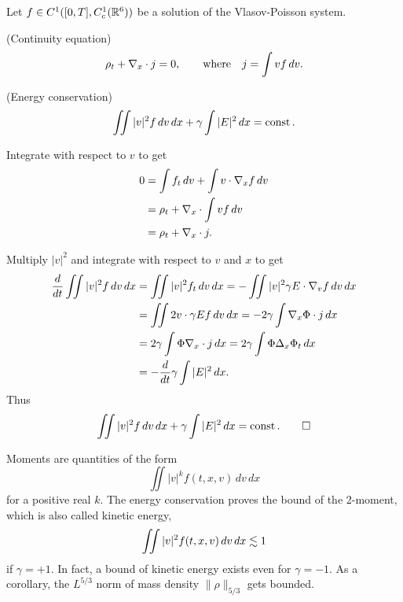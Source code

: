 \documentclass[11pt]{amsart}
\begin{document}
\begin{lem}
Let $f\in C^1([0,T],C_c^1(\mathbb{R}^6))$ be a solution of the Vlasov-Poisson system.
\begin{cond}
\item(Continuity equation)
\[\rho_t+\nabla_x\cdot j=0,\qquad\text{where}\quad j=\int vf\,dv.\]
\item(Energy conservation)
\[\iint|v|^2f\,dv\,dx+\gamma\int|E|^2\,dx=\operatorname{const}.\]
\end{cond}
\end{lem}
\begin{pfs}
\item
Integrate with respect to $v$ to get
\begin{align*}
0&=\int f_t\,dv+\int v\cdot\nabla_xf\,dv\\
&=\rho_t+\nabla_x\cdot\int vf\,dv\\
&=\rho_t+\nabla_x\cdot j.
\end{align*}
\item
Multiply $|v|^2$ and integrate with respect to $v$ and $x$ to get
\begin{align*}
\dd{t}\iint|v|^2f\,dv\,dx
&=\iint|v|^2f_t\,dv\,dx=-\iint|v|^2\gamma E\cdot\del_vf\,dv\,dx\\
&=\iint2v\cdot\gamma Ef\,dv\,dx=-2\gamma\int\del_x\Phi\cdot j\,dx\\
&=2\gamma\int\Phi\del_x\cdot j\,dx=2\gamma\int\Phi\Delta_x\Phi_t\,dx\\
&=-\dd{t}\gamma\int|E|^2\,dx.
\end{align*}
Thus
\[\iint|v|^2f\,dv\,dx+\gamma\int|E|^2\,dx=\operatorname{const}.\qedhere\]
\end{pfs}


Moments are quantities of the form
\[\iint|v|^kf(t,x,v)\,dv\,dx\]
for a positive real $k$.
The energy conservation proves the bound of the 2-moment, which is also called kinetic energy,
\[\iint|v|^2f(t,x,v)\,dv\,dx\lesssim1\]
if $\gamma=+1$.
In fact, a bound of kinetic energy exists even for $\gamma=-1$.
As a corollary, the $L^{5/3}$ norm of mass density $\|\rho\|_{5/3}$ gets bounded.
\end{document}
